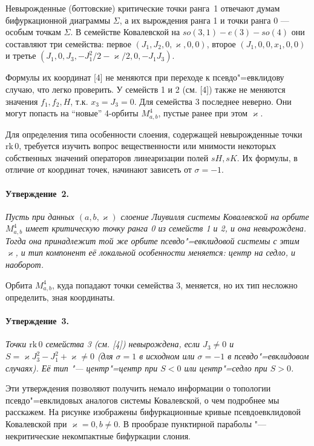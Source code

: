 Невырожденные (боттовские) критические точки ранга~1 отвечают думам бифуркационной диаграммы $\Sigma$, а их вырождения ранга 1 и точки ранга 0 --- особым точкам $\Sigma$. В семействе Ковалевской на $so(3,1)-e(3)-so(4)$ они составляют три семейства: первое $(J_1, J_2, 0, \varkappa, 0 , 0)$, второе $(J_1, 0, 0, x_1, 0 , 0)$ и третье $(J_1, 0, J_3, -J_1^2/2 -\varkappa/2, 0 , -J_1 J_3)$.

Формулы их координат [4] не меняются при переходе к псевдо"=евклидову случаю, что легко проверить. У семейств 1 и 2 (см. [4]) также не меняются значения $f_1, f_2, H$, т.к. $x_3 = J_3 = 0$. Для семейства $3$ последнее неверно. Они могут попасть на ``новые'' 4-орбиты $M^4_{a, b}$, пустые ранее при этом $\varkappa$.

Для определения типа особенности слоения, содержащей невырожденные точки $\mathrm{rk}\,0$, требуется изучить вопрос вещественности или мнимости некоторых собственных значений операторов линеаризации полей $sH, sK$. Их формулы, в отличие от координат точек, начинают зависеть от $\sigma = -1$.

\paragraph{Утверждение~2.}
{\it
	Пусть при данных $(a, b, \varkappa)$ слоение Лиувилля системы Ковалевской на орбите $M^4_{a, b}$ имеет критическую точку ранга 0 из семейств 1 и 2, и она невырождена. Тогда она принадлежит той же орбите псевдо"=евклидовой системы с этим $\varkappa$, и тип компонент её локальной особенности меняется: центр на седло, и наоборот.
}

Орбита $M^4_{a, b}$, куда попадают точки семейства 3, меняется, но их тип несложно определить, зная координаты.

\paragraph{Утверждение~3.}
{\it
	Точки $\mathrm{rk}\,0$ семейства 3 (см. [4]) невырождена, если $J_3 \ne 0$ и $S = \varkappa J_3^2 - J_1^2 + \varkappa \ne 0$ (для $\sigma = 1$ в исходном или $\sigma = -1$ в псевдо"=евклидовом случаях). Её тип "--- центр"=центр при $S<0$ или центр"=седло при $S >0$.
}

Эти утверждения позволяют получить немало информации о топологии псевдо"=евклидовых аналогов системы Ковалевской, о чем подробнее мы расскажем. На рисунке изображены бифуркационные кривые псевдоевклидовой Ковалевской при $\varkappa = 0, b \ne 0$. В прообразе пунктирной параболы "--- некритические некомпактные бифуркации слония.

